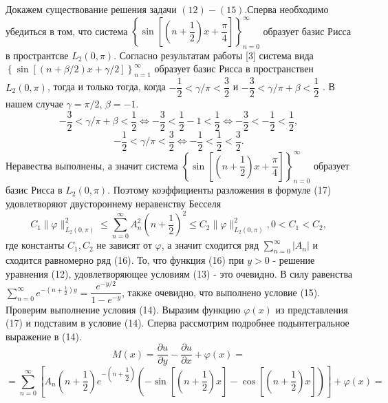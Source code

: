\documentclass[12pt, a4paper]{article}
\begin{document}
	
	Докажем существование решения задачи $(12) - (15)$.Сперва необходимо убедиться в том, что система  $\left\{\sin{\left[\left(n + \dfrac12\right)x + \dfrac\pi4\right]}\right\}_{n=0}^{\infty}$ образует базис Рисса в пространтсве $L_2(0, \pi)$. Согласно результатам работы [3] система вида  $\left\{\sin\left[\left(n+\beta/2\right)x + \gamma/2\right]\right\}_{n=1}^{\infty}$ образует базис Рисса в пространствен $L_2(0,\pi)$, тогда и только тогда, когда  $-\dfrac12 < \gamma/\pi < \dfrac32$ и $-\dfrac32 < \gamma/\pi + \beta < \dfrac12$ . В нашем случае $\gamma = \pi/2,\, \beta = -1$.
	\begin{equation*}
		-\dfrac32 < \gamma/\pi + \beta < \dfrac12 \Leftrightarrow -\dfrac32 < \dfrac12 - 1 < \dfrac12 \Leftrightarrow  -\dfrac32 < -\dfrac12 < \dfrac12,
	\end{equation*}	
	\begin{equation*}
		-\dfrac12 < \gamma/\pi < \dfrac32 \Leftrightarrow 	-\dfrac12 < \dfrac12 < \dfrac32.
	\end{equation*}
	Неравества выполнены, а значит система $\left\{\sin{\left[\left(n + \dfrac12\right)x + \dfrac\pi4\right]}\right\}_{n=0}^{\infty}$ образует базис Рисса в $L_2(0, \pi)$. Поэтому коэффициенты разложения в формуле (17) удовлетворяют двустороннему неравенству Бесселя
	\begin{equation*}
		C_1 \|\varphi \|^2_{L_2(0,\pi)} \leq \sum\limits_{n=0}^{\infty} A_n^2 \left(n + \dfrac12\right)^2 \leq C_2 \|\varphi \|^2_{L_2(0,\pi)} , 0 < C_1 < C_2, 
	\end{equation*}
	где константы $C_1, C_2$ не зависят от $\varphi$, 
	а значит сходится ряд $\sum\limits_{n=0}^{\infty} |A_n|$ и сходится равномерно ряд (16). То, что функция (16) при $y > 0$ - решение уравнения (12), удовлетворяющее условиям (13) - это очевидно. В силу равенства $\sum\limits_{n=0}^{\infty} e^{-\left(n + \frac12\right)y} = \dfrac{e^{-y/2}}{1 - e^{-y}}$, также очевидно, что выполнено условие (15). Проверим выполнение условия (14).\newline
	Выразим функцию $\varphi(x)$ из представления (17) и подставим в условие (14). Сперва рассмотрим подробнее подынтегральное выражение в (14).
	\begin{equation*}
		M(x) = \dfrac{\partial u}{\partial y} - \dfrac{\partial u}{\partial x} + \varphi(x) =
	\end{equation*}
	\begin{equation*}
		= \sum\limits_{n=0}^{\infty}  \left[A_n \left(n + \dfrac12 \right)e^{-\left(n+\dfrac12\right)} \left( -\sin{\left[\left(n+\dfrac12\right)x\right]} - \cos{\left[\left(n+\dfrac12\right)x\right]} \right) \right] + \varphi(x) = 
	\end{equation*}
\end{document}

